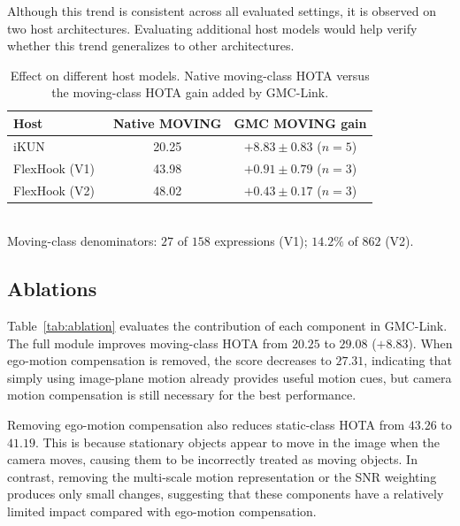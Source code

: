 \documentclass[sigconf,anonymous,nonacm]{acmart}
\begin{document}
Although this trend is consistent across all evaluated settings, it is observed on two host architectures. Evaluating additional host models would help verify whether this trend generalizes to other architectures.

\begin{table}[t]
\centering
\caption{Effect on different host models. Native moving-class HOTA versus the moving-class HOTA gain added by GMC-Link.}
\label{tab:deficit}
\small
\begin{tabular}{lcc}
\toprule
Host & Native MOVING & GMC MOVING gain \\
\midrule
iKUN~\cite{ikun}             & 20.25 & $+8.83 \pm 0.83$ ($n{=}5$) \\
FlexHook (V1)~\cite{flexhook}  & 43.98 & $+0.91 \pm 0.79$ ($n{=}3$) \\
FlexHook (V2)~\cite{flexhook}  & 48.02 & $+0.43 \pm 0.17$ ($n{=}3$) \\
\bottomrule
\end{tabular}
\\[2pt]
{\footnotesize Moving-class denominators: $27$ of $158$ expressions (V1); $14.2\%$ of $862$ (V2).}
\end{table}

\subsection{Ablations}
\label{sec:ablation}

Table~\ref{tab:ablation} evaluates the contribution of each component in GMC-Link. The full module improves moving-class HOTA from $20.25$ to $29.08$ ($+8.83$). When ego-motion compensation is removed, the score decreases to $27.31$, indicating that simply using image-plane motion already provides useful motion cues, but camera motion compensation is still necessary for the best performance.

Removing ego-motion compensation also reduces static-class HOTA from $43.26$ to $41.19$. This is because stationary objects appear to move in the image when the camera moves, causing them to be incorrectly treated as moving objects. In contrast, removing the multi-scale motion representation or the SNR weighting produces only small changes, suggesting that these components have a relatively limited impact compared with ego-motion compensation.
\end{document}
